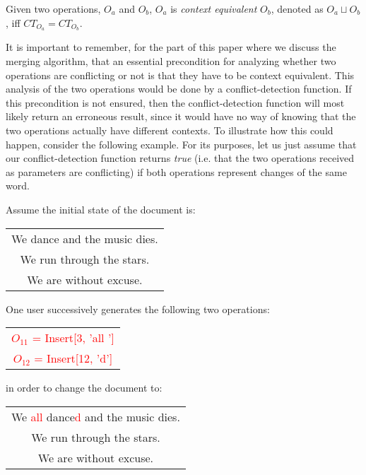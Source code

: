 \begin{defi}
Given two operations, $O_{a}$ and $O_{b}$, $O_{a}$ is \emph{context equivalent} $O_{b}$,
denoted as $O_{a} \sqcup  O_{b}$, iff $CT_{O_{a}}=CT_{O_{b}}$.
\end{defi}

It is important to remember, for the part of this paper where we discuss the merging
algorithm, that an essential precondition for analyzing whether two operations are
conflicting or not is that they have to be context equivalent. This analysis of the
two operations would be done by a conflict-detection function. If this precondition
is not ensured, then the conflict-detection function will most likely return an erroneous result,
since it would have no way of knowing that the two operations actually have different
contexts. To illustrate how this could happen, consider the following example. For its
purposes, let us just assume that our conflict-detection function returns
\emph{true} (i.e. that the two operations received as parameters are conflicting)
if both operations represent changes of the same word.

Assume the initial state of the document is:

\begin{center}
\begin{tabular}[c]{|c|}
\hline
We dance and the music dies.\\
We run through the stars.\\
We are without excuse.\\
\hline
\end{tabular}
\end{center}

One user successively generates the following two operations:

\begin{center}
\begin{tabular}[c]{|c|}
\hline
\textcolor{red}{$O_{11}$ = Insert[3, 'all ']}\\
\textcolor{red}{$O_{12}$ = Insert[12, 'd']}\\
\hline
\end{tabular}
\end{center}

in order to change the document to:

\begin{center}
\begin{tabular}[c]{|c|}
\hline
We \textcolor{red}{all} dance\textcolor{red}{d} and the music dies.\\
We run through the stars.\\
We are without excuse.\\
\hline
\end{tabular}
\end{center}


